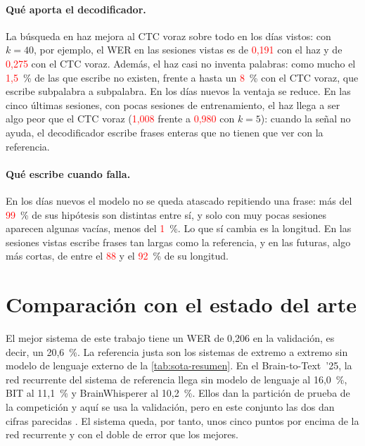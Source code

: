 \paragraph{Qué aporta el decodificador.} La búsqueda en haz mejora al CTC voraz sobre todo en los días vistos: con $k = 40$, por ejemplo, el WER en las sesiones vistas es de \textcolor{red}{0,191} con el haz y de \textcolor{red}{0,275} con el CTC voraz. Además, el haz casi no inventa palabras: como mucho el \textcolor{red}{1,5}~\% de las que escribe no existen, frente a hasta un \textcolor{red}{8}~\% con el CTC voraz, que escribe subpalabra a subpalabra. En los días nuevos la ventaja se reduce. En las cinco últimas sesiones, con pocas sesiones de entrenamiento, el haz llega a ser algo peor que el CTC voraz (\textcolor{red}{1,008} frente a \textcolor{red}{0,980} con $k = 5$): cuando la señal no ayuda, el decodificador escribe frases enteras que no tienen que ver con la referencia.

\paragraph{Qué escribe cuando falla.} En los días nuevos el modelo no se queda atascado repitiendo una frase: más del \textcolor{red}{99}~\% de sus hipótesis son distintas entre sí, y solo con muy pocas sesiones aparecen algunas vacías, menos del \textcolor{red}{1}~\%. Lo que sí cambia es la longitud. En las sesiones vistas escribe frases tan largas como la referencia, y en las futuras, algo más cortas, de entre el \textcolor{red}{88} y el \textcolor{red}{92}~\% de su longitud.

\section{Comparación con el estado del arte}
\label{sec:res-sota}

El mejor sistema de este trabajo tiene un WER de 0,206 en la validación, es decir, un 20,6~\%. La referencia justa son los sistemas de extremo a extremo sin modelo de lenguaje externo de la \cref{tab:sota-resumen}. En el Brain-to-Text~'25, la red recurrente del sistema de referencia llega sin modelo de lenguaje al 16,0~\%, BIT al 11,1~\% y BrainWhisperer al 10,2~\%. Ellos dan la partición de prueba de la competición y aquí se usa la validación, pero en este conjunto las dos dan cifras parecidas \cite{lightbeam}. El sistema queda, por tanto, unos cinco puntos por encima de la red recurrente y con el doble de error que los mejores.

